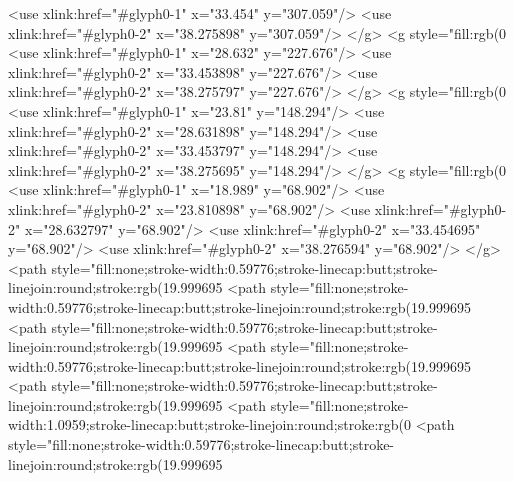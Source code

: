   <use xlink:href="#glyph0-1" x="33.454" y="307.059"/>
  <use xlink:href="#glyph0-2" x="38.275898" y="307.059"/>
</g>
<g style="fill:rgb(0%
  <use xlink:href="#glyph0-1" x="28.632" y="227.676"/>
  <use xlink:href="#glyph0-2" x="33.453898" y="227.676"/>
  <use xlink:href="#glyph0-2" x="38.275797" y="227.676"/>
</g>
<g style="fill:rgb(0%
  <use xlink:href="#glyph0-1" x="23.81" y="148.294"/>
  <use xlink:href="#glyph0-2" x="28.631898" y="148.294"/>
  <use xlink:href="#glyph0-2" x="33.453797" y="148.294"/>
  <use xlink:href="#glyph0-2" x="38.275695" y="148.294"/>
</g>
<g style="fill:rgb(0%
  <use xlink:href="#glyph0-1" x="18.989" y="68.902"/>
  <use xlink:href="#glyph0-2" x="23.810898" y="68.902"/>
  <use xlink:href="#glyph0-2" x="28.632797" y="68.902"/>
  <use xlink:href="#glyph0-2" x="33.454695" y="68.902"/>
  <use xlink:href="#glyph0-2" x="38.276594" y="68.902"/>
</g>
<path style="fill:none;stroke-width:0.59776;stroke-linecap:butt;stroke-linejoin:round;stroke:rgb(19.999695%
<path style="fill:none;stroke-width:0.59776;stroke-linecap:butt;stroke-linejoin:round;stroke:rgb(19.999695%
<path style="fill:none;stroke-width:0.59776;stroke-linecap:butt;stroke-linejoin:round;stroke:rgb(19.999695%
<path style="fill:none;stroke-width:0.59776;stroke-linecap:butt;stroke-linejoin:round;stroke:rgb(19.999695%
<path style="fill:none;stroke-width:0.59776;stroke-linecap:butt;stroke-linejoin:round;stroke:rgb(19.999695%
<path style="fill:none;stroke-width:1.0959;stroke-linecap:butt;stroke-linejoin:round;stroke:rgb(0%
<path style="fill:none;stroke-width:0.59776;stroke-linecap:butt;stroke-linejoin:round;stroke:rgb(19.999695%
